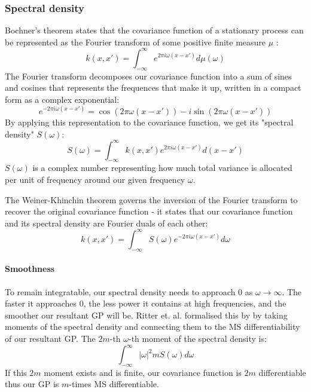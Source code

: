 \subsubsection{Spectral density}
Bochner's theorem states that the covariance function of a stationary process can be represented as the Fourier transform of some positive finite measure $\mu$ \cite{bochner}:
\begin{equation*}
    k(x, x') = \int_{-\infty}^{\infty} e^{2\pi i \omega (x - x')} d\mu(\omega)
\end{equation*}
The Fourier transform decomposes our covariance function into a sum of sines and cosines that represents the frequences that make it up, written in a compact form as a complex exponential:
\begin{equation*}
    e^{-2\pi i \omega (x - x')} = \cos(2\pi \omega (x - x')) - i \sin(2\pi \omega (x - x'))
\end{equation*}
By applying this representation to the covariance function, we get its "spectral density" $S(\omega)$:
\begin{equation*}
    S(\omega) = \int_{-\infty}^{\infty} k(x, x') e^{2\pi i \omega (x - x')} d(x - x')
\end{equation*}
$S(\omega)$ is a complex number representing how much total variance is allocated per unit of frequency around our given frequency $\omega$. 

The Weiner-Khinchin theorem governs the inversion of the Fourier transform to recover the original covariance function - it states that our covariance function and its spectral density are Fourier duals of each other: 
\begin{equation*}
    k(x, x') = \int_{-\infty}^{\infty} S(\omega) e^{-2\pi i \omega (x - x')} d\omega
\end{equation*}

\paragraph{Smoothness}
To remain integratable, our spectral density needs to approach $0$ as $\omega \to \infty$. The faster it approaches $0$, the less power it contains at high frequencies, and the smoother our resultant GP will be. Ritter et. al. \cite{fourier-moments} formalised this by by taking moments of the spectral density and connecting them to the MS differentiability of our resultant GP. The $2m$-th $\omega$-th moment of the spectral density is:
\begin{equation*}
    \int_{-\infty}^{\infty} |\omega|^2m S(\omega) d\omega
\end{equation*}
If this $2m$ moment exists and is finite, our covariance function is $2m$ differentiable thus our GP is $m$-times MS differentiable. 

